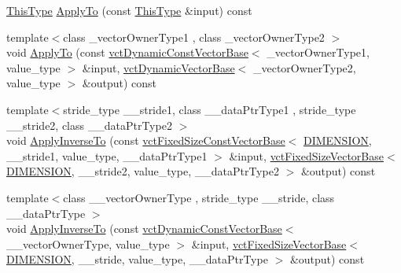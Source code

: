 \begin{DoxyCompactItemize}
\item 
\hyperlink{classvct_quaternion_base_af28efdc38acf89acb7a67afada11408c}{This\+Type} \hyperlink{classvct_quaternion_rotation3_base_ab0bdd0eb7271055fbcbadaea2e2cddaa}{Apply\+To} (const \hyperlink{classvct_quaternion_base_af28efdc38acf89acb7a67afada11408c}{This\+Type} \&input) const 
\item 
{\footnotesize template$<$class \+\_\+vector\+Owner\+Type1 , class \+\_\+vector\+Owner\+Type2 $>$ }\\void \hyperlink{classvct_quaternion_rotation3_base_a818da0e1bd6791417dc16af9f4f55aa5}{Apply\+To} (const \hyperlink{classvct_dynamic_const_vector_base}{vct\+Dynamic\+Const\+Vector\+Base}$<$ \+\_\+vector\+Owner\+Type1, value\+\_\+type $>$ \&input, \hyperlink{classvct_dynamic_vector_base}{vct\+Dynamic\+Vector\+Base}$<$ \+\_\+vector\+Owner\+Type2, value\+\_\+type $>$ \&output) const 
\item 
{\footnotesize template$<$stride\+\_\+type \+\_\+\+\_\+stride1, class \+\_\+\+\_\+data\+Ptr\+Type1 , stride\+\_\+type \+\_\+\+\_\+stride2, class \+\_\+\+\_\+data\+Ptr\+Type2 $>$ }\\void \hyperlink{classvct_quaternion_rotation3_base_ac822156b1d72851cd10fa02726fb616e}{Apply\+Inverse\+To} (const \hyperlink{classvct_fixed_size_const_vector_base}{vct\+Fixed\+Size\+Const\+Vector\+Base}$<$ \hyperlink{classvct_quaternion_rotation3_base_a729ac03acdd5949ecf382629e563d2a0a9417132a8a6849e18439d903ae6a1f18}{D\+I\+M\+E\+N\+S\+I\+O\+N}, \+\_\+\+\_\+stride1, value\+\_\+type, \+\_\+\+\_\+data\+Ptr\+Type1 $>$ \&input, \hyperlink{classvct_fixed_size_vector_base}{vct\+Fixed\+Size\+Vector\+Base}$<$ \hyperlink{classvct_quaternion_rotation3_base_a729ac03acdd5949ecf382629e563d2a0a9417132a8a6849e18439d903ae6a1f18}{D\+I\+M\+E\+N\+S\+I\+O\+N}, \+\_\+\+\_\+stride2, value\+\_\+type, \+\_\+\+\_\+data\+Ptr\+Type2 $>$ \&output) const 
\item 
{\footnotesize template$<$class \+\_\+\+\_\+vector\+Owner\+Type , stride\+\_\+type \+\_\+\+\_\+stride, class \+\_\+\+\_\+data\+Ptr\+Type $>$ }\\void \hyperlink{classvct_quaternion_rotation3_base_a59b85aed1b88591dd44d0be6611a19a0}{Apply\+Inverse\+To} (const \hyperlink{classvct_dynamic_const_vector_base}{vct\+Dynamic\+Const\+Vector\+Base}$<$ \+\_\+\+\_\+vector\+Owner\+Type, value\+\_\+type $>$ \&input, \hyperlink{classvct_fixed_size_vector_base}{vct\+Fixed\+Size\+Vector\+Base}$<$ \hyperlink{classvct_quaternion_rotation3_base_a729ac03acdd5949ecf382629e563d2a0a9417132a8a6849e18439d903ae6a1f18}{D\+I\+M\+E\+N\+S\+I\+O\+N}, \+\_\+\+\_\+stride, value\+\_\+type, \+\_\+\+\_\+data\+Ptr\+Type $>$ \&output) const 

\end{DoxyCompactItemize}
